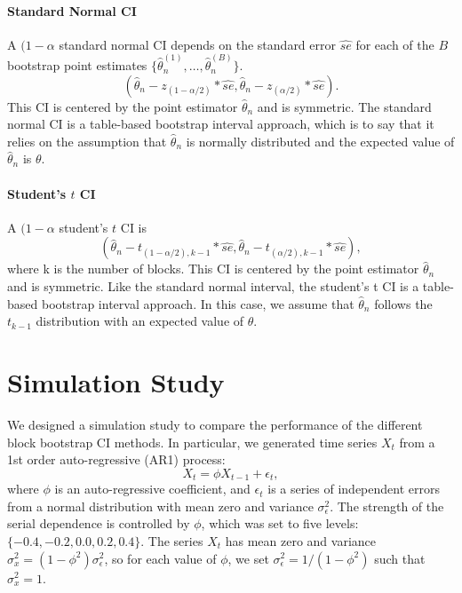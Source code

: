\documentclass[12pt, letterpaper, titlepage]{article}
\begin{document}
\paragraph{Standard Normal CI}

A $(1 - \alpha$ standard normal CI depends on the standard error $\hat{se}$
for each of the
$B$ bootstrap point estimates
$\{\hat\theta_n^{(1)}, \ldots, \hat\theta_n^{(B)}\}$. 
\[
(\hat{\theta}_{n} - z_{(1-\alpha/2)}*\hat{se}, \hat{\theta}_{n} -
z_{(\alpha/2)}*\hat{se}).
\]
This CI is centered by the point estimator $\hat\theta_n$ and is symmetric.
The standard
normal CI is a table-based bootstrap interval approach, which is to say that
it relies on the 
assumption that $\hat\theta_n$ is normally distributed and the expected value
of $\hat\theta_n$
is $\theta$.

\paragraph{Student's $t$ CI}
A $(1 - \alpha$ student's $t$ CI is
\[
(\hat{\theta}_{n} - t_{(1-\alpha/2), k - 1}*\hat{se}, \hat{\theta}_{n} -
t_{(\alpha/2), k -1}*\hat{se}),
\]
where k is the number of blocks.
This CI is centered by the point estimator $\hat\theta_n$ and is symmetric.
Like the standard 
normal interval, the student's t CI is a table-based bootstrap interval
approach. In this case,
we assume that $\hat\theta_n$ follows the $t_{k-1}$ distribution with an
expected value of $\theta$.


\section{Simulation Study}
\label{sec:simu}

We designed a simulation study to compare the performance of the different
block
bootstrap CI methods. In particular, we generated time series $X_t$
from a 1st order auto-regressive (AR1) process:
\[
X_t = \phi X_{t-1} + \epsilon_t,
\]
where $\phi$ is an auto-regressive coefficient, and $\epsilon_t$ is a series of
independent errors from a normal distribution with mean zero and variance
$\sigma_{\epsilon}^2$. The strength of the serial dependence is controlled by
$\phi$, which was set to five levels: $\{-0.4, -0.2, 0.0, 0.2, 0.4\}$.
The series $X_t$ has mean zero and variance
$\sigma_x^2 = (1 - \phi^2) \sigma_{\epsilon}^2$, so for each value of $\phi$,
we
set $\sigma_{\epsilon}^2 = 1 / (1 - \phi^2)$ such that $\sigma_x^2 = 1$.
\end{document}
